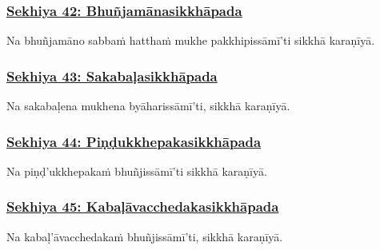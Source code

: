 \subsubsection*{\hyperref[training42]{Sekhiya 42: Bhuñjamānasikkhāpada}}
\label{sekh42}

Na bhuñjamāno sabbaṁ hatthaṁ mukhe pakkhipissāmī'ti sikkhā karaṇīyā.



\subsubsection*{\hyperref[training43]{Sekhiya 43: Sakabaḷasikkhāpada}}
\label{sekh43}

Na sakabaḷena\makeatletter\hyperlink{endnote496-appendix}\makeatother{} mukhena byāharissāmī'ti,\makeatletter\hyperlink{endnote497-appendix}\makeatother{} sikkhā karaṇīyā.



\subsubsection*{\hyperref[training44]{Sekhiya 44: Piṇḍukkhepakasikkhāpada}}
\label{sekh44}

Na piṇḍ'ukkhepakaṁ bhuñjissāmī'ti sikkhā karaṇīyā.



\subsubsection*{\hyperref[training45]{Sekhiya 45: Kabaḷāvacchedakasikkhāpada}}
\label{sekh45}

Na kabaḷ'āvacchedakaṁ\makeatletter\hyperlink{endnote498-appendix}\makeatother{} bhuñjissāmī'ti, sikkhā karaṇīyā.



